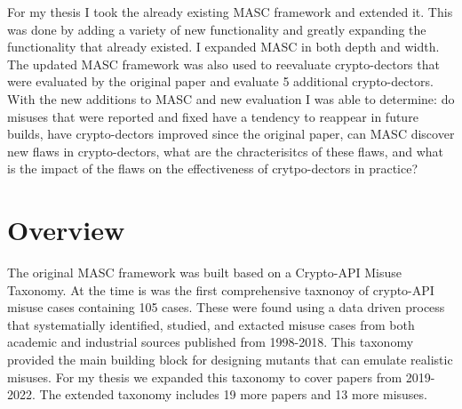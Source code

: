 For my thesis I took the already existing MASC framework and extended it. This was done by adding a variety of new functionality and greatly expanding the functionality that already existed. I expanded MASC in both depth and width. The updated MASC framework was also used to reevaluate crypto-dectors that were evaluated by the original paper and evaluate 5 additional crypto-dectors. With the new additions to MASC and new evaluation I was able to determine: do misuses that were reported and fixed have a tendency to reappear in future builds, have crypto-dectors improved since the original paper, can MASC discover new flaws in crypto-dectors, what are the chracterisitcs of these flaws, and what is the impact of the flaws on the effectiveness of crytpo-dectors in practice?



\section{Overview}
\label{ch1:sec:overview}


The original MASC framework was built based on a Crypto-API Misuse Taxonomy. At the time is was the first comprehensive taxnonoy of crypto-API misuse cases containing 105 cases. These were found using a data driven process that systematially identified, studied, and extacted misuse cases from both academic and industrial sources published from 1998-2018. This taxonomy provided the main building block for designing mutants that can emulate realistic misuses. For my thesis we expanded this taxonomy to cover papers from 2019-2022. The extended taxonomy includes 19 more papers and 13 more misuses.

